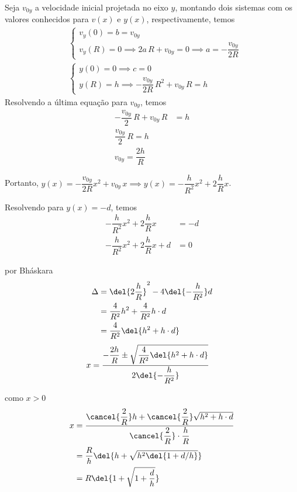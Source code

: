 \documentclass[]{IMTexam}
\begin{document}
\begin{questions}
\begin{solution}
		Seja $ v_{0y} $ a velocidade inicial projetada no eixo $ y $, montando dois sistemas com os valores conhecidos para $ v(x) $ e $ y(x) $, respectivamente, temos
		\begin{align*}
			 & \begin{cases}
				v_y(0)=b=v_{0y} \\
				v_y(R)=0\implies 2a\,R+v_{0y}=0\implies a=-\dfrac{v_{0y}}{2R}
			\end{cases} \\
			 & \begin{cases}
				y(0)=0\implies c=0 \\
				y(R)=h\implies -\dfrac{v_{0y}}{2R}\,R^{2}+v_{0y}\,R=h
			\end{cases}
		\end{align*}
		Resolvendo a última equação para $ v_{0y} $, temos
		\begin{align*}
			-\dfrac{v_{0y}}{2}\,R+v_{0y}\,R & =h \\
			\dfrac{v_{0y}}{2}\,R=h               \\
			v_{0y}=\dfrac{2h}{R}
		\end{align*}

		Portanto, $ y(x)=-\dfrac{v_{0y}}{2R}x^{2}+v_{0y}\,x\implies y(x)=-\dfrac{h}{R^{2}}x^{2}+2\dfrac{h}{R}x $.

		Resolvendo para $ y(x)=-d $, temos
		\begin{align*}
			-\dfrac{h}{R^{2}}x^{2}+2\dfrac{h}{R}x   & =-d \\
			-\dfrac{h}{R^{2}}x^{2}+2\dfrac{h}{R}x+d & =0
		\end{align*}

		\begin{multi}[2][t]

			por Bháskara
			\begin{align*}
				\Delta & =\del{2\dfrac{h}{R}}^{2}-4\del{-\dfrac{h}{R^{2}}}d \\
				       & =\dfrac{4}{R^{2}}h^{2}+\dfrac{4}{R^{2}}h\cdot d    \\
				       & =\dfrac{4}{R^{2}}\del{h^{2}+h\cdot d}
			\end{align*}
			\begin{align*}
				x & =\dfrac{-\dfrac{2h}{R}\pm\sqrt{\dfrac{4}{R^{2}}\del{h^{2}+h\cdot d}}}{2\del{-\dfrac{h}{R^{2}}}}
			\end{align*}

			\nextcol
			como $ x>0 $
			\begin{align*}
				x & =\dfrac{\cancel{\dfrac{2}{R}}h+\cancel{\dfrac{2}{R}}\sqrt{h^{2}+h\cdot d}}{\cancel{\dfrac{2}{R}}\cdot\dfrac{h}{R}} \\
				  & =\dfrac{R}{h}\del{h+\sqrt{h^{2}\del{1+d/h}}}                                                                       \\
				  & =R\del{1+\sqrt{1+\dfrac{d}{h}}}
			\end{align*}
		\end{multi}
	\end{solution}


\end{questions}
\end{document}
